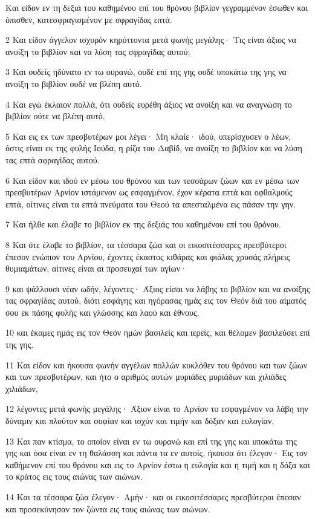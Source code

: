 \par Και είδον εν τη δεξιά του καθημένου επί του θρόνου βιβλίον γεγραμμένον έσωθεν και όπισθεν, κατεσφραγισμένον με σφραγίδας επτά.
\par 2 Και είδον άγγελον ισχυρόν κηρύττοντα μετά φωνής μεγάλης· Τις είναι άξιος να ανοίξη το βιβλίον και να λύση τας σφραγίδας αυτού;
\par 3 Και ουδείς ηδύνατο εν τω ουρανώ, ουδέ επί της γης ουδέ υποκάτω της γης να ανοίξη το βιβλίον ουδέ να βλέπη αυτό.
\par 4 Και εγώ έκλαιον πολλά, ότι ουδείς ευρέθη άξιος να ανοίξη και να αναγνώση το βιβλίον ούτε να βλέπη αυτό.
\par 5 Και εις εκ των πρεσβυτέρων μοι λέγει· Μη κλαίε· ιδού, υπερίσχυσεν ο λέων, όστις είναι εκ της φυλής Ιούδα, η ρίζα του Δαβίδ, να ανοίξη το βιβλίον και να λύση τας επτά σφραγίδας αυτού.
\par 6 Και είδον και ιδού εν μέσω του θρόνου και των τεσσάρων ζώων και εν μέσω των πρεσβυτέρων Αρνίον ιστάμενον ως εσφαγμένον, έχον κέρατα επτά και οφθαλμούς επτά, οίτινες είναι τα επτά πνεύματα του Θεού τα απεσταλμένα εις πάσαν την γην.
\par 7 Και ήλθε και έλαβε το βιβλίον εκ της δεξιάς του καθημένου επί του θρόνου.
\par 8 Και ότε έλαβε το βιβλίον, τα τέσσαρα ζώα και οι εικοσιτέσσαρες πρεσβύτεροι έπεσον ενώπιον του Αρνίου, έχοντες έκαστος κιθάρας και φιάλας χρυσάς πλήρεις θυμιαμάτων, αίτινες είναι αι προσευχαί των αγίων·
\par 9 και ψάλλουσι νέαν ωδήν, λέγοντες· Άξιος είσαι να λάβης το βιβλίον και να ανοίξης τας σφραγίδας αυτού, διότι εσφάγης και ηγόρασας ημάς εις τον Θεόν διά του αίματός σου εκ πάσης φυλής και γλώσσης και λαού και έθνους,
\par 10 και έκαμες ημάς εις τον Θεόν ημών βασιλείς και ιερείς, και θέλομεν βασιλεύσει επί της γης.
\par 11 Και είδον και ήκουσα φωνήν αγγέλων πολλών κυκλόθεν του θρόνου και των ζώων και των πρεσβυτέρων, και ήτο ο αριθμός αυτών μυριάδες μυριάδων και χιλιάδες χιλιάδων,
\par 12 λέγοντες μετά φωνής μεγάλης· Άξιον είναι το Αρνίον το εσφαγμένον να λάβη την δύναμιν και πλούτον και σοφίαν και ισχύν και τιμήν και δόξαν και ευλογίαν.
\par 13 Και παν κτίσμα, το οποίον είναι εν τω ουρανώ και επί της γης και υποκάτω της γης και όσα είναι εν τη θαλάσση και πάντα τα εν αυτοίς, ήκουσα ότι έλεγον· Εις τον καθήμενον επί του θρόνου και εις το Αρνίον έστω η ευλογία και η τιμή και η δόξα και το κράτος εις τους αιώνας των αιώνων.
\par 14 Και τα τέσσαρα ζώα έλεγον· Αμήν· και οι εικοσιτέσσαρες πρεσβύτεροι έπεσαν και προσεκύνησαν τον ζώντα εις τους αιώνας των αιώνων.

